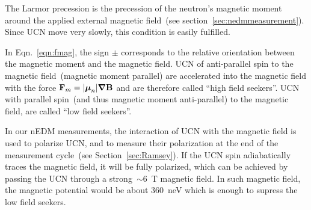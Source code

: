 The Larmor precession is the precession of the neutron's magnetic
moment around the applied external magnetic field~(see
section~\ref{sec:nedmmeasurement}). Since UCN move very slowly, this
condition is easily fulfilled.



In Eqn.~\ref{eqn:fmag}, the sign $\pm$ corresponds to the relative
orientation between the magnetic moment and the magnetic field.  UCN
of anti-parallel spin to the magnetic field~(magnetic moment parallel)
are accelerated into the magnetic field with the force
$ {\bf{F}}_m = \vert {\boldsymbol{\mu}}_n \vert \boldsymbol{\nabla}
\bf{B} $ and are therefore called ``high field seekers''. UCN with
parallel spin~(and thus magnetic moment anti-parallel) to the magnetic
field, are called ``low field seekers''.





In our nEDM measurements, the interaction of UCN with the magnetic
field is used to polarize UCN, and to measure their polarization at the
end of the measurement cycle~(see Section~\ref{sec:Ramsey}).  If the
UCN spin adiabatically traces the magnetic field, it will be fully
polarized, which can be achieved by passing the UCN through a
strong~$\sim 6$~T magnetic field. In such magnetic field, the magnetic
potential would be about 360~neV which is enough to supress the low
field seekers.



